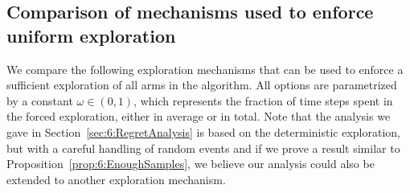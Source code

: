 \subsection{Comparison of mechanisms used to enforce uniform exploration}\label{sec:6:exploringDifferentForcedExplorationMechanisms}

%

We compare the following exploration mechanisms that can be used to enforce a sufficient exploration of all arms in the \GLRklUCB{} algorithm.
All options are parametrized by a constant $\omega\in(0,1)$, which represents the fraction of time steps spent in the forced exploration, either in average or in total.
%
Note that the analysis we gave in Section~\ref{sec:6:RegretAnalysis} is based on the deterministic exploration, but with a careful handling of random events and if we prove a result similar to Proposition~\ref{prop:6:EnoughSamples}, we believe our analysis could also be extended to another exploration mechanism.

